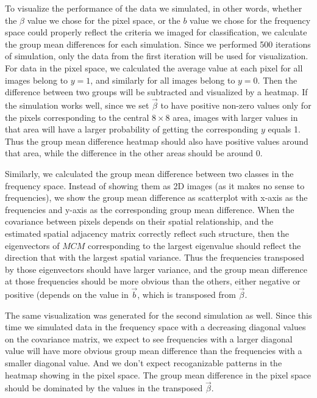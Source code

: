 \documentclass[12pt]{article}
\begin{document}
To visualize the performance of the data we simulated, in other words, whether the \( \beta \) value we chose for the pixel space, or the \( b \) value we chose for the frequency space could properly reflect the criteria we imaged for classification, we calculate the group mean differences for each simulation. Since we performed 500 iterations of simulation, only the data from the first iteration will be used for visualization. For data in the pixel space, we calculated the average value at each pixel for all images belong to \( y=1 \), and similarly for all images belong to \( y=0 \). Then the difference between two groups will be subtracted and visualized by a heatmap. If the simulation works well, since we set \( \vec{\beta} \) to have positive non-zero values only for the pixels corresponding to the central \( 8 \times 8 \) area, images with larger values in that area will have a larger probability of getting the corresponding \( y \) equals 1. Thus the group mean difference heatmap should also have positive values around that area, while the difference in the other areas should be around 0.

Similarly, we calculated the group mean difference between two classes in the frequency space. Instead of showing them as 2D images (as it makes no sense to frequencies), we show the group mean difference as scatterplot with x-axis as the frequencies and y-axis as the corresponding group mean difference. When the covariance between pixels depends on their spatial relationship, and the estimated spatial adjacency matrix correctly reflect such structure, then the eigenvectors of \( M C M \) corresponding to the largest eigenvalue should reflect the direction that with the largest spatial variance. Thus the frequencies transposed by those eigenvectors should have larger variance, and the group mean difference at those frequencies should be more obvious than the others, either negative or positive (depends on the value in \( \vec{b} \), which is transposed from \( \vec{\beta} \). 

The same visualization was generated for the second simulation as well. Since this time we simulated data in the frequency space with a decreasing diagonal values on the covariance matrix, we expect to see frequencies with a larger diagonal value will have more obvious group mean difference than the frequencies with a smaller diagonal value. And we don't expect recoganizable patterns in the heatmap showing in the pixel space. The group mean difference in the pixel space should be dominated by the values in the transposed \( \vec{\beta} \).
\end{document}
